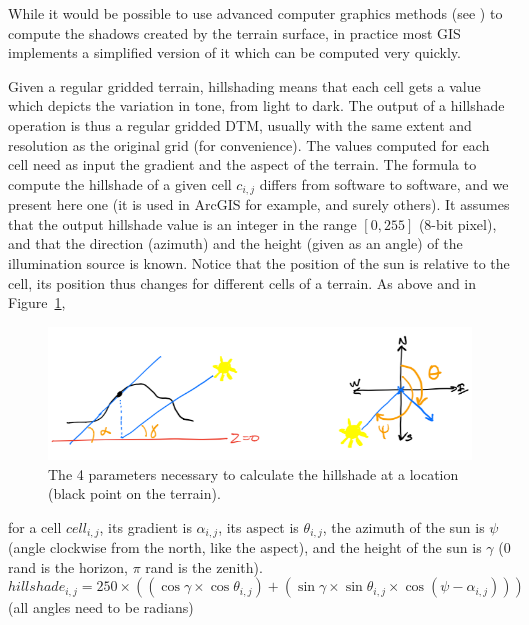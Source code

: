 While it would be possible to use advanced computer graphics methods (see ) to compute the shadows created by the terrain surface, in practice most GIS implements a simplified version of it which can be computed very quickly.

Given a regular gridded terrain, hillshading means that each cell gets a value which depicts the variation in tone, from light to dark.
The output of a hillshade operation is thus a regular gridded DTM, usually with the same extent and resolution as the original grid (for convenience).
The values computed for each cell need as input the gradient and the aspect of the terrain\@.
The formula to compute the hillshade of a given cell $c_{i,j}$ differs from software to software, and we present here one (it is used in ArcGIS for example, and surely others).
It assumes that the output hillshade value is an integer in the range $[0,255]$ (8-bit pixel), and that the direction (azimuth) and the height (given as an angle) of the illumination source is known.
Notice that the position of the sun is relative to the cell, its position thus changes for different cells of a terrain\@.
As above and in Figure~\ref{fig:hillshade-params}, 
\begin{figure}
  \centering
  \includegraphics[width=0.95\linewidth]{figs/hillshade-params}
  \caption{The 4 parameters necessary to calculate the hillshade at a location (black point on the terrain).}%
\label{fig:hillshade-params}
\end{figure}
for a cell $cell_{i,j}$, its gradient is $\alpha_{i,j}$, its aspect is $\theta_{i,j}$, the azimuth of the sun is $\psi$ (angle clockwise from the north, like the aspect), and the height of the sun is $\gamma$ (0 rand is the horizon, $\pi$ rand is the zenith).
\begin{equation}  
  hillshade_{i,j} = 250 \times ((\cos\gamma \times \cos\theta_{i,j}) + (\sin\gamma \times \sin\theta_{i,j} \times \cos (\psi - \alpha_{i,j}))) 
\end{equation}
(all angles need to be radians)




